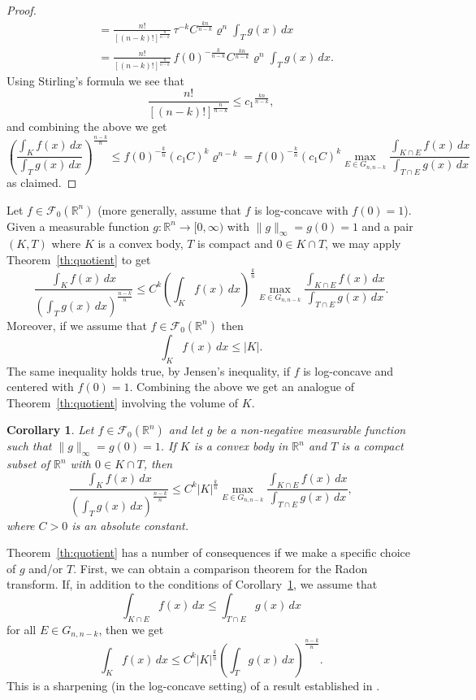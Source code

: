 \documentclass[11pt,leqno]{article}
\newtheorem{corollary}[theorem]{Corollary}
\theoremstyle{definition}
\theoremstyle{remark}
\numberwithin{equation}{section}
\newcommand{\ls}{\leqslant}
\newcommand{\1}{\textbf{1}}
\begin{document}
\begin{proof}
\begin{align*}
&= \frac{n!}{[(n-k)!]^{\frac{n}{n-k}}}\,\tau^{-k} C^{\frac{kn}{n-k}}\varrho^{n}
\int_Tg(x)\,dx\\
&= \frac{n!}{[(n-k)!]^{\frac{n}{n-k}}}\,f(0)^{-\frac{k}{n-k}} C^{\frac{kn}{n-k}}\varrho^{n}
\int_Tg(x)\,dx.
\end{align*}
Using Stirling's formula we see that
$$\frac{n!}{[(n-k)!]^{\frac{n}{n-k}}}\ls {c_1}^{\frac{kn}{n-k}},$$
and combining the above we get
$$\left(\frac{\int_Kf(x)\,dx}{\int_Tg(x)\,dx}\right)^{\frac{n-k}{n}}\ls f(0)^{-\frac{k}{n}}(c_1C)^k\varrho^{n-k}
=f(0)^{-\frac{k}{n}}(c_1C)^k\max_{E\in G_{n,n-k}} \frac{\int_{K\cap E} f(x)\,dx}{\int_{T\cap E} g(x)\,dx}$$
as claimed.\end{proof}

Let $f\in {\mathcal F}_0({\mathbb R}^n)$ (more generally, assume that $f$ is log-concave with $f(0)=1$).
Given a measurable function $g:{\mathbb R}^n\to [0,\infty)$ with $\|g\|_{\infty}=g(0)=1$ and a pair $(K,T)$ where $K$ is
a convex body, $T$ is compact and $0\in K\cap T$, we may apply Theorem~\ref{th:quotient} to get
$$\frac{\int_{K}f(x)\,dx}{\left(\int_{T}g(x)\,dx\right)^{\frac{n-k}{n}}}\ls
C^k\left(\int_{K}f(x)\,dx\right)^{\frac{k}{n}}
\max_{E\in G_{n,n-k}} \frac{\int_{K\cap E} f(x)\,dx}{\int_{T\cap E} g(x)\,dx}.$$
Moreover, if we assume that $f\in {\mathcal F}_0({\mathbb R}^n)$ then
$$\int_{K}f(x)\,dx\ls |K|.$$
The same inequality holds true, by Jensen's inequality, if $f$ is log-concave and centered with $f(0)=1$.
Combining the above we get an analogue of Theorem~\ref{th:quotient} involving the volume of $K$.

\begin{corollary}\label{cor:quotient-1}Let $f\in {\mathcal F}_0({\mathbb R}^n)$ and let $g$ be
a non-negative measurable function such that $\|g\|_\infty=g(0)=1$.
If $K$ is a convex body in ${\mathbb R}^n$ and $T$ is a compact subset of ${\mathbb R}^n$ with $0\in K\cap T$, then
\begin{equation}\label{eq:cor-quotient}
\frac{\int_Kf(x)\,dx}{\left(\int_T g(x)\,dx\right)^{\frac{n-k}{n}}}  \ls C^k
|K|^{\frac{k}{n}}\max_{E\in G_{n,n-k}} \frac{\int_{K\cap E} f(x)\,dx}{\int_{T\cap E} g(x)\,dx},
\end{equation}
where $C>0$ is an absolute constant.
\end{corollary}

Theorem~\ref{th:quotient} has a number of consequences if we make a specific choice of $g$ and/or $T$. First, we
can obtain a comparison theorem for the Radon transform. If, in addition to the conditions of Corollary~\ref{cor:quotient-1},
we assume that
$$\int_{K\cap E}f(x)\,dx\ls \int_{T\cap E} g(x)\,dx$$
for all $E\in G_{n,n-k}$, then we get
$$\int_K f(x)\,dx \ls C^k |K|^{\frac kn}\left(\int_Tg(x)\,dx\right)^{\frac{n-k}n}.$$
This is a sharpening (in the log-concave setting) of a result established in \cite{Koldobsky-Paouris-Zvavitch-2022}.
\end{document}

